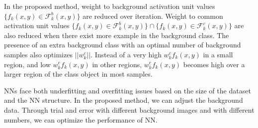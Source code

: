 \documentclass{article}
\begin{document}
In the proposed method,  weight to background activation unit values $\{f_k (x,y) \in \mathcal{F}_k^b (x,y)\}$ are reduced over iteration. Weight to common activation unit values $\{f_k (x,y) \in \mathcal{F}_k^b (x,y)\} \cap \{f_k (x,y) \in \mathcal{F}_k^c (x,y)\}$ are also reduced when there exist more example in the background class. The presence of an extra background class with an optimal number of background samples also optimizes $||w_k^c||$. Instead of a very high $ w_k^c f_k (x,y)$ in a small region, and low $ w_k^c f_k (x,y)$ in other regions, $ w_k^c f_k (x,y)$ becomes high over a larger region of the class object in most samples. 

NNs face both underfitting and overfitting issues based on the size of the dataset and the NN structure. In the proposed method, we can adjust the background data. Through trial and error with different background images and with different numbers, we can optimize the performance of NN.
\end{document}
